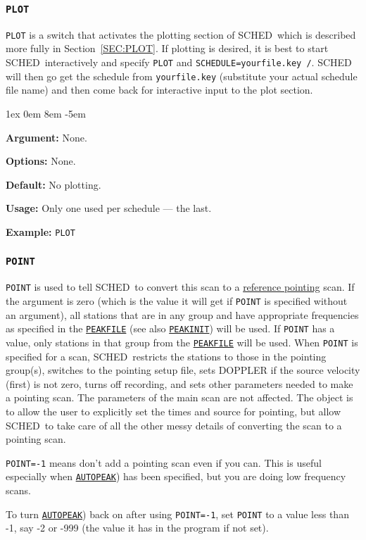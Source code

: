 \documentclass{report}
\newcommand{\schedb}{{\sc SCHED~}}
\newcommand{\rcwbox}[5]{
  \begin{list}{}{\parsep 1ex  \itemsep 0em
                 \leftmargin 8em  \itemindent -5em }
    \item {\bf Argument:} #1
    \item {\bf Options:}  #2
    \item {\bf Default:}  #3
    \item {\bf Usage:}    #4
    \item {\bf Example:}  #5
  \end{list}
}
\begin{document}
\subsubsection{\label{MP:PLOT}{\tt PLOT}}

{\tt PLOT} is a switch that activates the plotting section of
\schedb which is described more fully in Section~\ref{SEC:PLOT}.
If plotting is desired, it is best to start \schedb interactively
and specify {\tt PLOT} and {\tt SCHEDULE=yourfile.key /}.  \schedb
will then go get the schedule from {\tt yourfile.key} (substitute
your actual schedule file name) and then come back for interactive
input to the plot section.

\rcwbox
{None.}
{None.}
{No plotting.}
{Only one used per schedule --- the last.}
{{\tt PLOT}}


\subsubsection{\label{MP:POINT}{\tt POINT}}

{\tt POINT} is used to tell \schedb to convert this scan to a
{\hyperref[SEC:REFPOINT]{reference pointing}} scan.  If the argument
is zero (which is the value it will get if {\tt POINT} is specified
without an argument), all stations that are in any group and have
appropriate frequencies as specified in the 
{\hyperref[MP:PEAKFILE]{{\tt PEAKFILE}}} (see also 
{\hyperref[MP:PEAKINIT]{{\tt PEAKINIT}}}) will
be used.  If {\tt POINT} has a value, only stations in that group
from the 
{\hyperref[MP:PEAKFILE]{{\tt PEAKFILE}}} will be used.  When
{\tt POINT} is specified for a scan, \schedb restricts the stations
to those in the pointing group(s), switches to the pointing setup
file, sets DOPPLER if the source velocity (first) is not zero, turns
off recording, and sets other parameters needed to make a pointing
scan.  The parameters of the main scan are not affected.  The object
is to allow the user to explicitly set the times and source for
pointing, but allow \schedb to take care of all the other messy
details of converting the scan to a pointing scan.

{\tt POINT=-1} means don't add a pointing scan even if you can.  This
is useful especially when 
{\hyperref[MP:AUTOPEAK]{{\tt AUTOPEAK}}}) has
been specified, but you are doing low frequency scans.

To turn 
{\hyperref[MP:AUTOPEAK]{{\tt AUTOPEAK}}}) back on after using
{\tt POINT=-1}, set {\tt POINT} to a value less than -1, say -2 or
-999 (the value it has in the program if not set).
\end{document}
